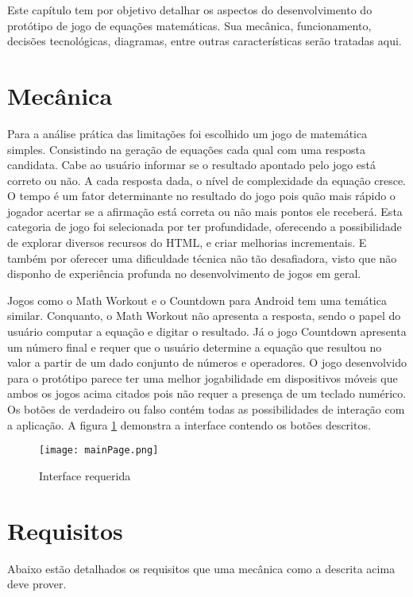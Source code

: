 Este capítulo tem por objetivo detalhar os aspectos do desenvolvimento
do protótipo de jogo de equações matemáticas. Sua mecânica, funcionamento, decisões tecnológicas,
diagramas, entre outras características serão tratadas aqui.

\section{Mecânica}

Para a análise prática das limitações foi escolhido um jogo de
matemática simples. Consistindo na geração de equações cada qual 
com uma resposta candidata. Cabe ao usuário informar se o resultado apontado
pelo jogo está correto ou não. A cada resposta dada, o nível de
complexidade da equação cresce. O tempo é um fator determinante
no resultado do jogo pois quão mais rápido o jogador acertar se a
afirmação está correta ou não mais pontos ele receberá. Esta
categoria de jogo foi selecionada por ter profundidade, oferecendo a
possibilidade de explorar diversos recursos do HTML, e criar melhorias
incrementais. E também por oferecer uma dificuldade técnica não
tão desafiadora, visto que não disponho de experiência profunda no
desenvolvimento de jogos em geral.

Jogos como o Math Workout e o Countdown para Android tem uma temática
similar. Conquanto, o Math Workout não apresenta a resposta, sendo o
papel do usuário computar a equação e digitar o resultado. Já o jogo
Countdown apresenta um número final e requer que o usuário determine
a equação que resultou no valor a partir de um dado conjunto de
números e operadores. O jogo desenvolvido para o protótipo parece ter
uma melhor jogabilidade em dispositivos móveis que ambos os jogos acima
citados pois não requer a presença de um teclado numérico. Os botões
de verdadeiro ou falso contém todas as possibilidades de interação
com a aplicação. A figura \ref{fig:sketch} demonstra a interface
contendo os botões descritos.

\begin{figure}[H]
    \centering
    \texttt{[image: mainPage.png]}
	\caption{Interface requerida}
    \label{fig:sketch}
\end{figure}


\section{Requisitos}

Abaixo estão detalhados os requisitos que uma mecânica como a descrita
acima deve prover.


